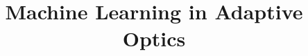 \def\BibTeX{{\rm B\kern-.05em{\sc i\kern-.025em b}\kern-.08em
    T\kern-.1667em\lower.7ex\hbox{E}\kern-.125emX}}

\usepackage{./packages}

\title{Machine Learning in Adaptive Optics}

\author{
}